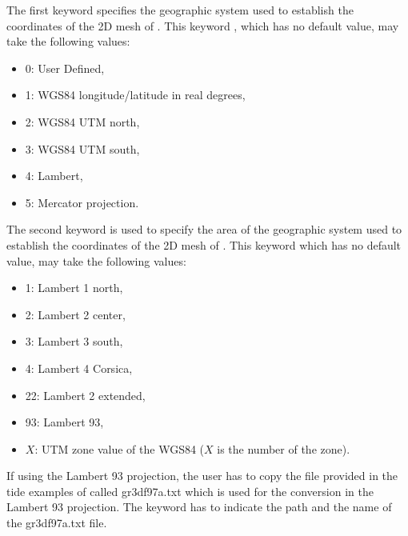 The first keyword specifies the geographic system used to establish the
coordinates of the 2D mesh of . This keyword , which has no default value, may take the following values:

\begin{itemize}
\item 0: User Defined,

\item 1: WGS84 longitude/latitude in real degrees,

\item 2: WGS84 UTM north,

\item 3: WGS84 UTM south,

\item 4: Lambert,

\item 5: Mercator projection.
\end{itemize}

The second keyword is used to specify the area of the geographic system used to
establish the coordinates of the 2D mesh of . This keyword
 which has no default value, may take
the following values:

\begin{itemize}
\item 1: Lambert 1 north,

\item 2: Lambert 2 center,

\item 3: Lambert 3 south,

\item 4: Lambert 4 Corsica,

\item 22: Lambert 2 extended,

\item 93: Lambert 93,

\item $X$: UTM zone value of the WGS84 ($X$ is the number of the
zone).
\end{itemize}

If using the Lambert 93 projection, the user has to copy the file provided
in the tide examples of  called gr3df97a.txt which is used
for the conversion in the Lambert 93 projection.
The keyword  has to indicate the path
and the name of the gr3df97a.txt file.
\\

